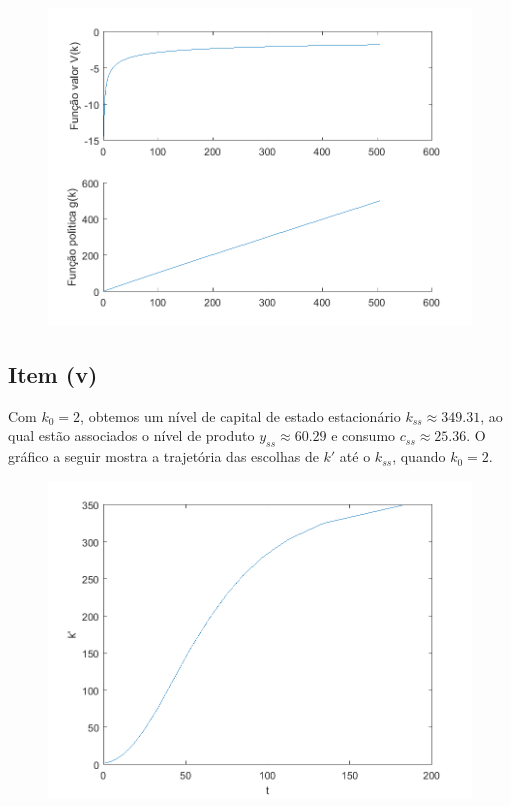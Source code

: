 \documentclass{article}
\begin{document}
\begin{figure}[!h]
  \includegraphics[scale=0.6]{ex2/ex2_1.png}
\end{figure}

\subsection*{Item (v)}

Com $k_0 = 2$, obtemos um nível de capital de estado estacionário $k_{ss} \approx 349.31$, 
ao qual estão associados o nível de produto $y_{ss} \approx 60.29$ e consumo $c_{ss} \approx 25.36$.
O gráfico a seguir mostra a trajetória das escolhas de $k'$ até o $k_{ss}$, quando $k_0 = 2$.

\begin{figure}[!h]
  \includegraphics[scale=0.6]{ex2/ex2_2.png}
\end{figure}
\end{document}
